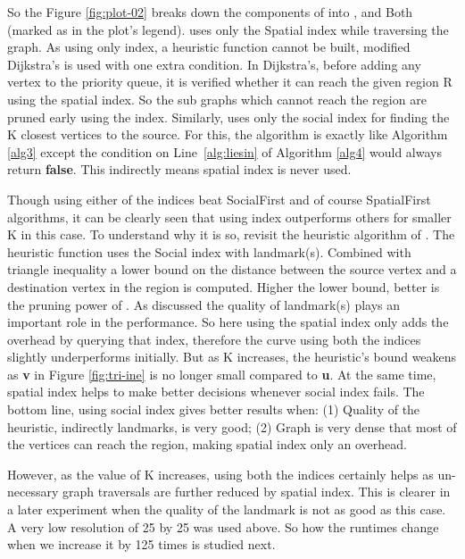 So the Figure \ref{fig:plot-02} breaks down the components of {\rrp} into {\rrpspatial}, {\rrpsocial} and Both (marked as {\rrp} in the plot's legend). {\rrpspatial} uses only the Spatial index while traversing the graph. As using only {\rrpspatial} index, a heuristic function cannot be built, modified Dijkstra's is used with one extra condition. In Dijkstra's, before adding any vertex to the priority queue, it is verified whether it can reach the given region R using the spatial index. So the sub graphs which cannot reach the region are pruned early using the index. Similarly, {\rrpsocial} uses only the social index for finding the K closest vertices to the source. For this, the algorithm is exactly like Algorithm \ref{alg3} except the condition on Line~\ref{alg:liesin} of Algorithm \ref{alg4} would always return \textbf{false}. This indirectly means spatial index is never used.

Though using either of the indices beat SocialFirst and of course SpatialFirst algorithms, it can be clearly seen that using {\rrpsocial} index outperforms others for smaller K in this case. To understand why it is so, revisit the heuristic algorithm of {\rrp}. The heuristic function uses the Social index with landmark(s). Combined with triangle inequality a lower bound on the distance between the source vertex and a destination vertex in the region is computed. Higher the lower bound, better is the pruning power of {\rrp}. As discussed the quality of landmark(s) plays an important role in the performance. So here using the spatial index only adds the overhead by querying that index, therefore the curve using both the indices slightly underperforms initially. But as K increases, the heuristic’s bound weakens as \textbf{v} in Figure \ref{fig:tri-ine} is no longer small compared to \textbf{u}. At the same time, spatial index helps {\rrp} to make better decisions whenever social index fails. The bottom line, using social index gives better results when: (1) Quality of the heuristic, indirectly landmarks, is very good; (2) Graph is very dense that most of the vertices can reach the region, making spatial index only an overhead.

However, as the value of K increases, using both the indices certainly helps as un-necessary graph traversals are further reduced by spatial index. This is clearer in a later experiment when the quality of the landmark is not as good as this case. A very low resolution of 25 by 25 was used above. So how the runtimes change when we increase it by 125 times is studied next.

